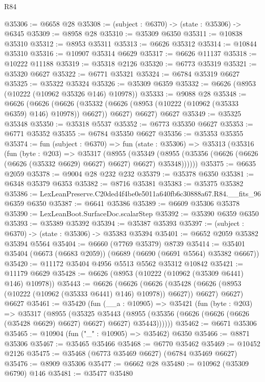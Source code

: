 \begin{lexlean}{R84}
\begin{coremodule}
@35306 := @6658 @28
@35308 := (subject : @6370) -> (state : @35306) -> @6345
@35309 := @8958 @28
@35310 := @35309 @6350
@35311 := @10838 @35310
@35312 := @8953 @35311
@35313 := @6626 @35312
@35314 := @10844 @35310
@35316 := @10907 @35314 @6629
@35317 := @6626 @11137
@35318 := @10222 @11188
@35319 := @35318 @2126
@35320 := @6773 @35319
@35321 := @35320 @6627
@35322 := @6771 @35321
@35324 := @6784 @35319 @6627
@35325 := @35322 @35324
@35326 := @35309 @6359
@35332 := @6626 (@8953 (@10222 (@10962 @35326 @146) @10978))
@35333 := @9088 @28
@35348 := @6626
    (@6626
      (@6626 (@35332 (@6626 (@8953 (@10222 (@10962 (@35333 @6359) @146) @10978)) @6627)) @6627)
      @6627)
    @6627
@35349 := @35325 @35348
@35350 := @35318 @5537
@35352 := @6773 @35350 @6627
@35353 := @6771 @35352
@35355 := @6784 @35350 @6627
@35356 := @35353 @35355
@35374 := fun (subject : @6370) =>
  fun (state : @35306) =>
  @35313
    (@35316
      (fun (byte : @203) =>
      @35317
        (@8955
          (@35349
            (@8955 (@35356 (@6626 (@6626 (@6626 (@35332 @6629) @6627) @6627) @6627) @35348))))))
@35375 := @6635 @2059
@35378 := @9004 @28 @232 @232
@35379 := @35378 @6350
@35381 := @6348 @35379 @6353
@35382 := @8716 @35381
@35383 := @35375 @35382
@35386 := LexLeanPreserve.C20ded4f4be0e5011a640fb6c30888a67.R84.__fits_96 @6359 @6350
@35387 := @6641 @35386
@35389 := @6609 @35306 @35378
@35390 := LexLeanBoot.SurfaceDoc.scalarStep
@35392 := @35390 @6359 @6350
@35393 := @35389 @35392
@35394 := @35387 @35393
@35397 := (subject : @6370) -> (state : @35306) -> @35383 @35394
@35401 := @6652 @2059 @35382 @35394 @5564
@35404 := @6660 (@7769 @35379) @8739
@35414 := @35401 @35404 (@6673 (@6683 @2059)) (@6689 (@6690 (@6691 @5564) @35382 @6667))
@35420 := @11172 @35404 @4956 @5513 @5562 @35312 @10842
@35421 := @11179 @6629
@35428 := @6626 (@8953 (@10222 (@10962 (@35309 @6441) @146) @10978))
@35443 := @6626
    (@6626
      (@6626 (@35428 (@6626 (@8953 (@10222 (@10962 (@35333 @6441) @146) @10978)) @6627)) @6627)
      @6627)
    @6627
@35461 := @35420
    (fun (__a : @10905) =>
    @35421
      (fun (byte : @203) =>
      @35317
        (@8955
          (@35325
            @35443
            (@8955 (@35356 (@6626 (@6626 (@6626 (@35428 @6629) @6627) @6627) @6627) @35443))))))
@35462 := @6671 @35306
@35465 := @10904 (fun ("_" : @10905) => @35462) @6350
@35466 := @8871 @35306
@35467 := @35465 @35466
@35468 := @6770 @35462
@35469 := @10452 @2126
@35475 := @35468 (@6773 @35469 @6627) (@6784 @35469 @6627)
@35476 := @8909 @35306
@35477 := @6662 @28
@35480 := @10962 (@35309 @6790) @146
@35481 := @35477 @35480

\end{coremodule}
\end{lexlean}
